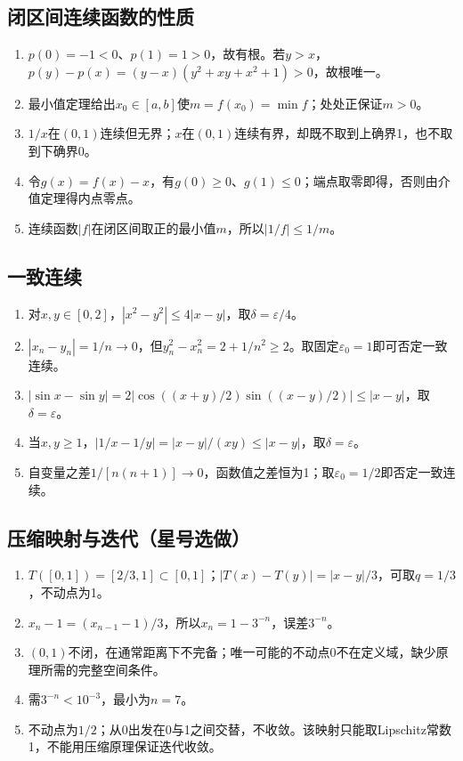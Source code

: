 \documentclass[11pt,a4paper,fontset=fandol]{ctexrep}
\begin{document}
\subsection{闭区间连续函数的性质}
\begin{enumerate}
\item $p(0)=-1<0$、$p(1)=1>0$，故有根。若$y>x$，$p(y)-p(x)=(y-x)(y^2+xy+x^2+1)>0$，故根唯一。
\item 最小值定理给出$x_0\in[a,b]$使$m=f(x_0)=\min f$；处处正保证$m>0$。
\item $1/x$在$(0,1)$连续但无界；$x$在$(0,1)$连续有界，却既不取到上确界1，也不取到下确界0。
\item 令$g(x)=f(x)-x$，有$g(0)\ge0$、$g(1)\le0$；端点取零即得，否则由介值定理得内点零点。
\item 连续函数$|f|$在闭区间取正的最小值$m$，所以$|1/f|\le1/m$。
\end{enumerate}
\subsection{一致连续}
\begin{enumerate}
\item 对$x,y\in[0,2]$，$|x^2-y^2|\le4|x-y|$，取$\delta=\varepsilon/4$。
\item $|x_n-y_n|=1/n\to0$，但$y_n^2-x_n^2=2+1/n^2\ge2$。取固定$\varepsilon_0=1$即可否定一致连续。
\item $|\sin x-\sin y|=2|\cos((x+y)/2)\sin((x-y)/2)|\le|x-y|$，取$\delta=\varepsilon$。
\item 当$x,y\ge1$，$|1/x-1/y|=|x-y|/(xy)\le|x-y|$，取$\delta=\varepsilon$。
\item 自变量之差$1/[n(n+1)]\to0$，函数值之差恒为1；取$\varepsilon_0=1/2$即否定一致连续。
\end{enumerate}
\subsection{压缩映射与迭代（星号选做）}
\begin{enumerate}
\item $T([0,1])=[2/3,1]\subset[0,1]$；$|T(x)-T(y)|=|x-y|/3$，可取$q=1/3$，不动点为1。
\item $x_n-1=(x_{n-1}-1)/3$，所以$x_n=1-3^{-n}$，误差$3^{-n}$。
\item $(0,1)$不闭，在通常距离下不完备；唯一可能的不动点0不在定义域，缺少原理所需的完整空间条件。
\item 需$3^{-n}<10^{-3}$，最小为$n=7$。
\item 不动点为$1/2$；从0出发在0与1之间交替，不收敛。该映射只能取Lipschitz常数1，不能用压缩原理保证迭代收敛。
\end{enumerate}
\end{document}
